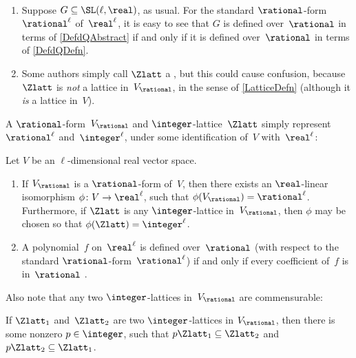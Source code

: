 \begin{rems} \ 
\noprelistbreak
 \begin{enumerate}
 \item Suppose $G \subseteq \SL(\ell,\real)$, as usual. For the standard
$\rational$-form $\rational^\ell$ of~$\real^\ell$, it is easy to see
that $G$ is defined over~$\rational$ in terms of
\cref{DefdQAbstract} if and only if it is defined
over~$\rational$ in terms of \cref{DefdQDefn}. 
 \item Some authors simply call $\Zlatt$ a 
 , 
 but this could cause confusion, because
$\Zlatt$ is \emph{not} a lattice in~$V_{\rational}$, in the
sense of \cref{LatticeDefn} (although it \emph{is} a
lattice in~$V$).
 \end{enumerate}
 \end{rems}

A $\rational$-form~$V_{\rational}$
and $\integer$-lattice~$\Zlatt$ simply represent
$\rational^\ell$ and~$\integer^\ell$, under some
identification of~$V$ with~$\real^\ell$:

\begin{lem} \label{VQ=Qd}
 Let\/ $V$ be an $\ell$-dimensional real vector space.
 \begin{enumerate}
 \item \label{VQ=Qd-VQ}
 If\/ $V_{\rational}$ is a\/ $\rational$-form of\/~$V$,
then there exists an\/ $\real$-linear isomorphism $\phi \colon V
\to \real^\ell$, such that $\phi(V_{\rational}) =
\rational^\ell$. Furthermore, if $\Zlatt$ is any
$\integer$-lattice in\/~$V_{\rational}$, then $\phi$ may be
chosen so that $\phi(\Zlatt) = \integer^\ell$.
 \item A polynomial~$f$ on\/~$\real^\ell$ is defined
over\/~$\rational$ \textup(with respect
to the standard\/ $\rational$-form~$\rational^\ell$\textup) if and
only if every coefficient of~$f$ is in\/~$\rational$
.
 \end{enumerate}
 \end{lem}

Also note that any two $\integer$-lattices
in~$V_{\rational}$ are commensurable:

\begin{lem}[\csee{VQ->vslatt}] \label{pLambda1inLambda2}
 If $\Zlatt_1$ and~$\Zlatt_2$ are two $\integer$-lattices
in $V_{\rational}$, then there is some nonzero $p \in
\integer$, such that $p \Zlatt_1 \subseteq \Zlatt_2$ and $p
\Zlatt_2 \subseteq \Zlatt_1$.
 \end{lem}

